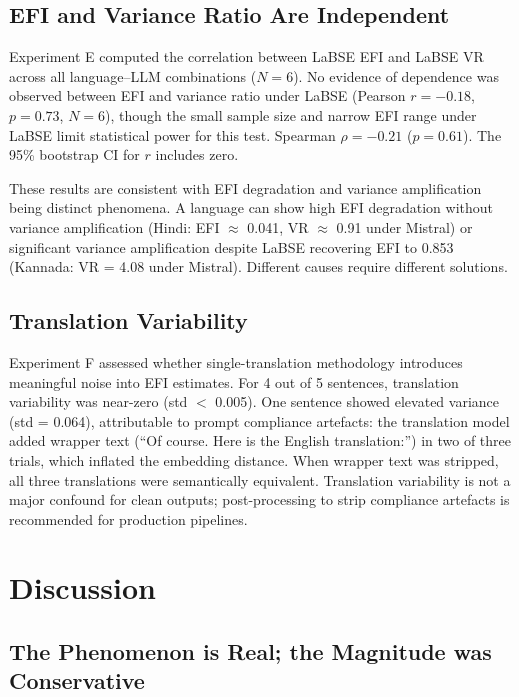 \documentclass[11pt,a4paper]{article}
\begin{document}
\subsection{EFI and Variance Ratio Are Independent}

Experiment E computed the correlation between LaBSE EFI and LaBSE VR across all
language--LLM combinations ($N = 6$). No evidence of dependence was observed between
EFI and variance ratio under LaBSE (Pearson $r = -0.18$, $p = 0.73$, $N = 6$), though
the small sample size and narrow EFI range under LaBSE limit statistical power for this
test. Spearman $\rho = -0.21$ ($p = 0.61$). The 95\% bootstrap CI for $r$ includes zero.

These results are consistent with EFI degradation and variance amplification being
distinct phenomena. A language can show high EFI degradation without
variance amplification (Hindi: EFI $\approx$ 0.041, VR $\approx$ 0.91 under Mistral)
or significant variance amplification despite LaBSE recovering EFI to 0.853 (Kannada:
VR = 4.08 under Mistral). Different causes require different solutions.

\subsection{Translation Variability}

Experiment F assessed whether single-translation methodology introduces meaningful noise
into EFI estimates. For 4 out of 5 sentences, translation variability was near-zero
(std $<$ 0.005). One sentence showed elevated variance (std = 0.064), attributable to
prompt compliance artefacts: the translation model added wrapper text
(``Of course. Here is the English translation:'') in two of three trials, which inflated
the embedding distance. When wrapper text was stripped, all three translations were
semantically equivalent. Translation variability is not a major confound for clean
outputs; post-processing to strip compliance artefacts is recommended for production
pipelines.

\section{Discussion}

\subsection{The Phenomenon is Real; the Magnitude was Conservative}
\end{document}
